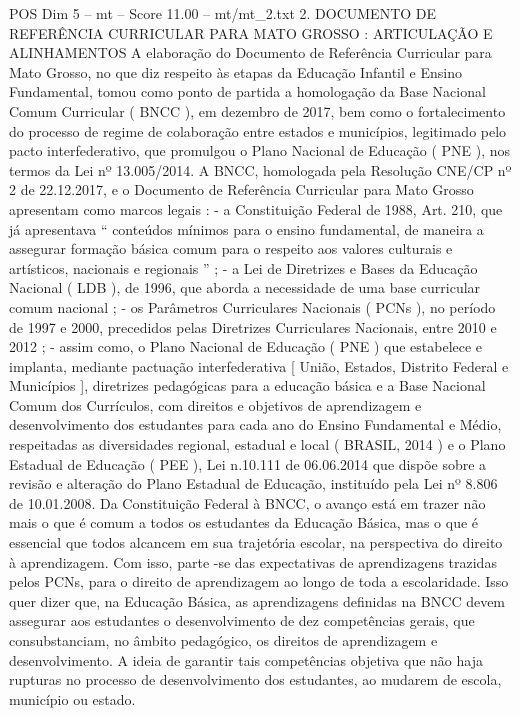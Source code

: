 \begin{textsample}{POS Dim 5 – mt – Score 11.00 – mt/mt\_2.txt}  \label{ex:f5_pos_081}
2.
DOCUMENTO DE REFERÊNCIA CURRICULAR PARA MATO GROSSO : ARTICULAÇÃO E ALINHAMENTOS A elaboração do Documento de Referência Curricular para Mato Grosso, no que diz respeito às etapas da Educação Infantil e Ensino Fundamental, tomou como ponto de partida a homologação da Base Nacional Comum Curricular ( BNCC ), em dezembro de 2017, bem como o fortalecimento do processo de regime de colaboração entre estados e municípios, legitimado pelo pacto interfederativo, que promulgou o Plano Nacional de Educação ( PNE ), nos termos da Lei nº 13.005/2014.
A BNCC, homologada pela Resolução CNE/CP nº 2 de 22.12.2017, e o Documento de Referência Curricular para Mato Grosso apresentam como marcos legais : - a Constituição Federal de 1988, Art. 210, que já apresentava “ conteúdos mínimos para o ensino fundamental, de maneira a assegurar formação básica comum para o respeito aos valores culturais e artísticos, nacionais e regionais ” ; - a Lei de Diretrizes e Bases da Educação Nacional ( LDB ), de 1996, que aborda a necessidade de uma base curricular comum nacional ; - os Parâmetros Curriculares Nacionais ( PCNs ), no período de 1997 e 2000, precedidos pelas Diretrizes Curriculares Nacionais, entre 2010 e 2012 ; - assim como, o Plano Nacional de Educação ( PNE ) que estabelece e implanta, mediante pactuação interfederativa [ União, Estados, Distrito Federal e Municípios ], diretrizes pedagógicas para a educação básica e a Base Nacional Comum dos Currículos, com direitos e objetivos de aprendizagem e desenvolvimento dos estudantes para cada ano do Ensino Fundamental e Médio, respeitadas as diversidades regional, estadual e local ( BRASIL, 2014 ) e o Plano Estadual de Educação ( PEE ), Lei n.10.111 de 06.06.2014 que dispõe sobre a revisão e alteração do Plano Estadual de Educação, instituído pela Lei nº 8.806 de 10.01.2008.
Da Constituição Federal à BNCC, o avanço está em trazer não mais o que é comum a todos os estudantes da Educação Básica, mas o que é essencial que todos alcancem em sua trajetória escolar, na perspectiva do direito à aprendizagem.
Com isso, parte -se das expectativas de aprendizagens trazidas pelos PCNs, para o direito de aprendizagem ao longo de toda a escolaridade.
Isso quer dizer que, na Educação Básica, as aprendizagens definidas na BNCC devem assegurar aos estudantes o desenvolvimento de dez competências gerais, que consubstanciam, no âmbito pedagógico, os direitos de aprendizagem e desenvolvimento.
A ideia de garantir tais competências objetiva que não haja rupturas no processo de desenvolvimento dos estudantes, ao mudarem de escola, município ou estado.

\end{textsample}
